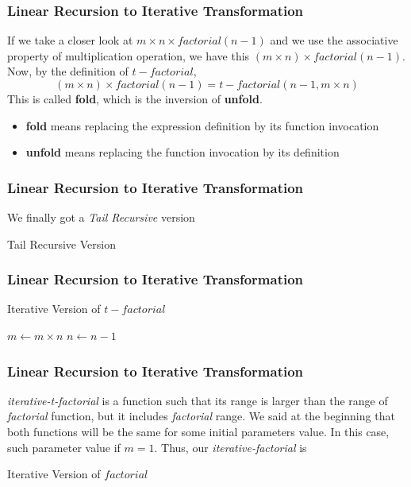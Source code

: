 \documentclass{beamer}
\begin{document}
\begin{frame}
	\frametitle{Linear Recursion to Iterative Transformation}
	If we take a closer look at $m \times n \times factorial(n-1)$ and we use the associative property of multiplication operation, we have this $(m\times n) \times factorial(n-1)$. Now, by the definition of $t-factorial$, 
	\begin{equation}
		(m\times n) \times factorial(n-1) = t-factorial(n-1,m \times n)
	\end{equation}
	This is called \textbf{fold}, which is the inversion of \textbf{unfold}.
	\begin{itemize}
		\item \textbf{fold} means replacing the expression definition by its function invocation
		\item \textbf{unfold} means replacing the function invocation by its definition
	\end{itemize}
\end{frame}
\begin{frame}
	\frametitle{Linear Recursion to Iterative Transformation}
	We finally got a \textit{Tail Recursive} version
	\begin{block}{Tail Recursive Version} 
		\begin{algorithmic}[1]
				\State{}
			\Else
				\State{}
			\EndIf
			\EndProcedure
		\end{algorithmic}
	\end{block}
\end{frame}
\begin{frame}
	\frametitle{Linear Recursion to Iterative Transformation}
	\begin{block}{Iterative Version of $t-factorial$}
		\begin{algorithmic}[1]
				\State $m \gets m \times n$
				\State $n \gets n-1$
			\EndWhile
			\State{}
			\EndProcedure
		\end{algorithmic}
	\end{block}
\end{frame}
\begin{frame}
	\frametitle{Linear Recursion to Iterative Transformation}
	\textit{iterative-t-factorial} is a function such that its range is larger than the range of \textit{factorial} function, but it includes \textit{factorial} range. We said at the beginning that both functions will be the same for some initial parameters value. In this case, such parameter value if $m = 1$. Thus, our \textit{iterative-factorial} is
	\begin{block}{Iterative Version of $factorial$}
		\begin{algorithmic}[1]
			\State{}
			\EndProcedure
		\end{algorithmic}
	\end{block}
\end{frame}
\end{document}
